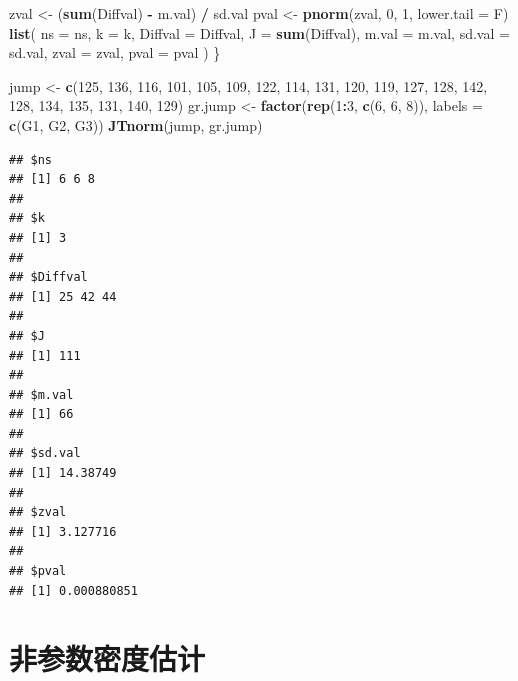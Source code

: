 \documentclass[
]{book}
\newenvironment{Shaded}{\begin{snugshade}}{\end{snugshade}}
\newcommand{\AttributeTok}[1]{\textcolor[rgb]{0.13,0.29,0.53}{#1}}
\newcommand{\DecValTok}[1]{\textcolor[rgb]{0.00,0.00,0.81}{#1}}
\newcommand{\FunctionTok}[1]{\textcolor[rgb]{0.13,0.29,0.53}{\textbf{#1}}}
\newcommand{\NormalTok}[1]{#1}
\newcommand{\OtherTok}[1]{\textcolor[rgb]{0.56,0.35,0.01}{#1}}
\newcommand{\SpecialCharTok}[1]{\textcolor[rgb]{0.81,0.36,0.00}{\textbf{#1}}}
\newcommand{\StringTok}[1]{\textcolor[rgb]{0.31,0.60,0.02}{#1}}
\begin{document}
\begin{Shaded}
\begin{Highlighting}[]
\NormalTok{  zval }\OtherTok{\textless{}{-}}\NormalTok{ (}\FunctionTok{sum}\NormalTok{(Diffval) }\SpecialCharTok{{-}}\NormalTok{ m.val) }\SpecialCharTok{/}\NormalTok{ sd.val}
\NormalTok{  pval }\OtherTok{\textless{}{-}} \FunctionTok{pnorm}\NormalTok{(zval, }\DecValTok{0}\NormalTok{, }\DecValTok{1}\NormalTok{, }\AttributeTok{lower.tail =}\NormalTok{ F)}
  \FunctionTok{list}\NormalTok{(}
    \AttributeTok{ns =}\NormalTok{ ns,}
    \AttributeTok{k =}\NormalTok{ k,}
    \AttributeTok{Diffval =}\NormalTok{ Diffval,}
    \AttributeTok{J =} \FunctionTok{sum}\NormalTok{(Diffval),}
    \AttributeTok{m.val =}\NormalTok{ m.val,}
    \AttributeTok{sd.val =}\NormalTok{ sd.val,}
    \AttributeTok{zval =}\NormalTok{ zval,}
    \AttributeTok{pval =}\NormalTok{ pval}
\NormalTok{  )}
\NormalTok{\}}

\NormalTok{jump }\OtherTok{\textless{}{-}} \FunctionTok{c}\NormalTok{(}\DecValTok{125}\NormalTok{, }\DecValTok{136}\NormalTok{, }\DecValTok{116}\NormalTok{, }\DecValTok{101}\NormalTok{, }\DecValTok{105}\NormalTok{, }\DecValTok{109}\NormalTok{, }\DecValTok{122}\NormalTok{, }\DecValTok{114}\NormalTok{, }\DecValTok{131}\NormalTok{, }\DecValTok{120}\NormalTok{, }\DecValTok{119}\NormalTok{, }\DecValTok{127}\NormalTok{, }\DecValTok{128}\NormalTok{, }\DecValTok{142}\NormalTok{, }\DecValTok{128}\NormalTok{, }\DecValTok{134}\NormalTok{, }\DecValTok{135}\NormalTok{, }\DecValTok{131}\NormalTok{, }\DecValTok{140}\NormalTok{, }\DecValTok{129}\NormalTok{)}
\NormalTok{gr.jump }\OtherTok{\textless{}{-}} \FunctionTok{factor}\NormalTok{(}\FunctionTok{rep}\NormalTok{(}\DecValTok{1}\SpecialCharTok{:}\DecValTok{3}\NormalTok{, }\FunctionTok{c}\NormalTok{(}\DecValTok{6}\NormalTok{, }\DecValTok{6}\NormalTok{, }\DecValTok{8}\NormalTok{)), }\AttributeTok{labels =} \FunctionTok{c}\NormalTok{(}\StringTok{\textquotesingle{}G1\textquotesingle{}}\NormalTok{, }\StringTok{\textquotesingle{}G2\textquotesingle{}}\NormalTok{, }\StringTok{\textquotesingle{}G3\textquotesingle{}}\NormalTok{))}
\FunctionTok{JTnorm}\NormalTok{(jump, gr.jump)}
\end{Highlighting}
\end{Shaded}

\begin{verbatim}
## $ns
## [1] 6 6 8
## 
## $k
## [1] 3
## 
## $Diffval
## [1] 25 42 44
## 
## $J
## [1] 111
## 
## $m.val
## [1] 66
## 
## $sd.val
## [1] 14.38749
## 
## $zval
## [1] 3.127716
## 
## $pval
## [1] 0.000880851
\end{verbatim}

\section{非参数密度估计}\label{ux975eux53c2ux6570ux5bc6ux5ea6ux4f30ux8ba1}
\end{document}
